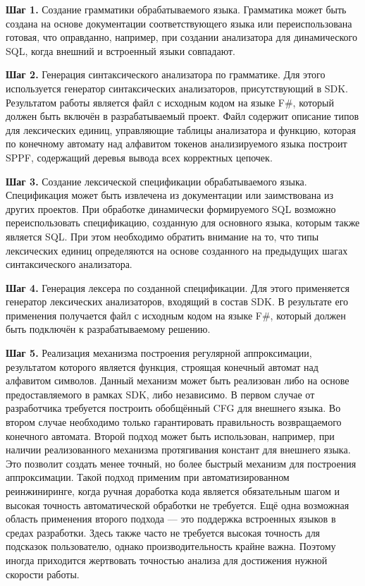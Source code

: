 \textbf{Шаг 1.} Создание грамматики обрабатываемого языка. Грамматика может быть создана на основе документации соответствующего языка или переиспользована готовая, что оправданно, например, при создании анализатора для динамического SQL, когда внешний и встроенный языки совпадают.

\textbf{Шаг 2.} Генерация синтаксического анализатора по грамматике. Для этого используется генератор синтаксических анализаторов, присутствующий в SDK. Результатом работы является файл с исходным кодом на языке F\#, который должен быть включён в разрабатываемый проект. Файл содержит описание типов для лексических единиц, управляющие таблицы анализатора и функцию, которая по конечному автомату над алфавитом токенов анализируемого языка построит SPPF, содержащий деревья вывода всех корректных цепочек.

\textbf{Шаг 3.} Создание лексической спецификации обрабатываемого языка. Спецификация может быть извлечена из документации или заимствована из других проектов. При обработке динамически формируемого SQL возможно переиспользовать спецификацию, созданную для основного языка, которым также является SQL. При этом необходимо обратить внимание на то, что типы лексических единиц определяются на основе созданного на предыдущих шагах синтаксического анализатора.

\textbf{Шаг 4.} Генерация лексера по созданной спецификации. Для этого применяется генератор лексических анализаторов, входящий в состав SDK. В результате его применения получается файл с исходным кодом на языке F\#, который должен быть подключён к разрабатываемому решению. 

\textbf{Шаг 5.} Реализация механизма построения регулярной аппроксимации, результатом которого является функция, строящая конечный автомат над алфавитом символов. Данный механизм может быть реализован либо на основе предоставляемого в рамках SDK, либо независимо. В первом случае от разработчика требуется построить обобщённый CFG для внешнего языка. Во втором случае необходимо только гарантировать правильность возвращаемого конечного автомата. Второй подход может быть использован, например, при наличии реализованного механизма протягивания констант для внешнего языка. Это позволит создать менее точный, но более быстрый механизм для построения аппроксимации. Такой подход применим при автоматизированном реинжиниринге, когда ручная доработка кода является обязательным шагом и высокая точность автоматической обработки не требуется. Ещё одна возможная область применения второго подхода --- это поддержка встроенных языков в средах разработки. Здесь также часто не требуется высокая точность для подсказок пользователю, однако производительность крайне важна. Поэтому иногда приходится жертвовать точностью анализа для достижения нужной скорости работы.

